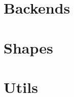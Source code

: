 
\section{Backends}\label{sec:backends}


\section{Shapes}\label{sec:shapes}


\section{Utils}\label{sec:utils}

